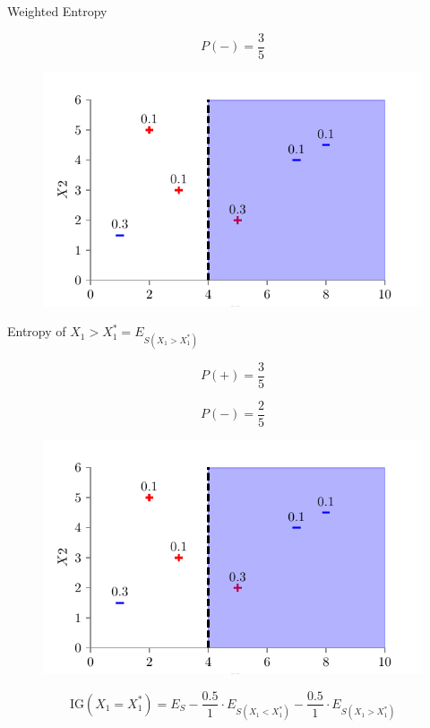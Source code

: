 \documentclass[usenames,dvipsnames]{beamer}
\begin{document}
\begin{section}{Weighted Entropy}
\begin{frame}
	$$P(-) = \frac{3}{5}$$

	\end{frame}

	\begin{frame}
	
	\begin{figure}
		\centering
		\includegraphics{../assets/decision-trees/figures/dt_weighted/fig5.pdf}
	\end{figure}
	Entropy of $X_1 > X_1^* = E_{S(X_1 > X_1^*)}$
	
	$$P(+) = \frac{3}{5}$$
	
	$$P(-) = \frac{2}{5}$$
	
	\end{frame}

	\begin{frame}
	
	\begin{figure}
		\centering
		\includegraphics{../assets/decision-trees/figures/dt_weighted/fig5.pdf}
	\end{figure}
	
	$$\text{IG}(X_1 = X_1^*) = E_S - \frac{0.5}{1} \cdot E_{S(X_1 < X_1^*)} - \frac{0.5}{1} \cdot E_{S(X_1 > X_1^*)}$$
	
	\end{frame}

\end{section}
\end{document}
